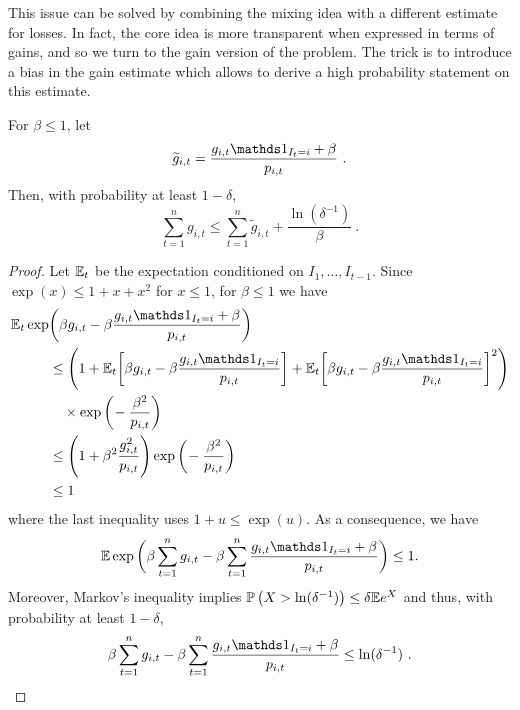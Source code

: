 This issue can be solved by combining the mixing idea with a different estimate for losses. In fact, the core idea is more transparent when expressed in terms of gains, and so we turn to the gain version of the problem. The trick is to introduce a bias in the gain estimate which allows to derive a high probability statement on this estimate.
%
\begin{lemma} \label{lem:exp3P}
For $\beta \le 1$, let
\[
    \tilde{g}_{i,t} = \frac{g_{i,t} \ds1_{I_t=i} + \beta}{p_{i,t}}~.
\]
Then, with probability at least $1-\delta$,
$$\sum_{t=1}^n g_{i,t} \leq \sum_{t=1}^n \tilde{g}_{i,t}  + \frac{\ln(\delta^{-1})}{\beta}~.$$
\end{lemma}
%
\begin{proof}
Let $\mathbb{E}_t$ be the expectation conditioned on $I_1,\dots,I_{t-1}$. Since $\exp(x)\le 1+x+x^2$ for $x\leq 1$, for $\beta\leq 1$ we have
\begin{align*}
    \E_t \exp&\bigg(\beta g_{i,t} - \beta \frac{g_{i,t} \ds1_{I_t=i} + \beta}{p_{i,t}}\bigg)
\\ &\leq
    \Bigg(1 + \E_t \bigg[\beta g_{i,t} - \beta \frac{g_{i,t} \ds1_{I_t=i}}{p_{i,t}}\bigg] + \E_t \bigg[\beta g_{i,t} - \beta \frac{g_{i,t} \ds1_{I_t=i}}{p_{i,t}}\bigg]^2 \Bigg)
\\ &\quad
    \times\exp\bigg(\!- \frac{\beta^2}{p_{i,t}}\bigg)
\\ &\leq
    \Bigg(1 + \beta^2 \frac{g^2_{i,t}}{p_{i,t}} \Bigg) \exp\bigg(\!- \frac{\beta^2}{p_{i,t}}\bigg)
\\ &\leq
     1
\end{align*}
where the last inequality uses $1+u \leq \exp(u)$. As a consequence, we have
  \begin{align*}
  \E \exp\bigg(\beta \sum_{t=1}^n g_{i,t} - \beta \sum_{t=1}^n \frac{g_{i,t} \ds1_{I_t=i} + \beta}{p_{i,t}}\bigg) \leq 1.
  \end{align*}
Moreover, Markov's inequality implies $\mathbb{P}\left(X>\ln(\delta^{-1})\right) \leq \delta \mathbb{E} e^X$ and thus, with probability at least $1-\delta$,
$$\beta \sum_{t=1}^n g_{i,t} - \beta \sum_{t=1}^n \frac{g_{i,t} \ds1_{I_t=i} + \beta}{p_{i,t}} \leq \ln(\delta^{-1})~.$$
\end{proof}
%
